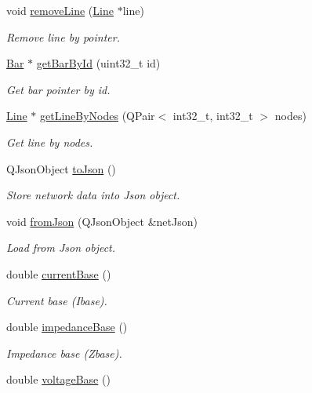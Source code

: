 \begin{DoxyCompactItemize}
void \hyperlink{group___models_ga4fd51288aa75614593977ce8aab9100f}{remove\+Line} (\hyperlink{class_line}{Line} $\ast$line)
\begin{DoxyCompactList}\small\item\em Remove line by pointer. \end{DoxyCompactList}\item 
\hyperlink{class_bar}{Bar} $\ast$ \hyperlink{group___models_ga04d524ce0fa0dd0d06deda92b1597af0}{get\+Bar\+By\+Id} (uint32\+\_\+t id)
\begin{DoxyCompactList}\small\item\em Get bar pointer by id. \end{DoxyCompactList}\item 
\hyperlink{class_line}{Line} $\ast$ \hyperlink{group___models_ga8f090b85a7779695cb9f05b6395b3044}{get\+Line\+By\+Nodes} (Q\+Pair$<$ int32\+\_\+t, int32\+\_\+t $>$ nodes)
\begin{DoxyCompactList}\small\item\em Get line by nodes. \end{DoxyCompactList}\item 
Q\+Json\+Object \hyperlink{group___models_ga1bb9773d3935eefef84136d388786494}{to\+Json} ()
\begin{DoxyCompactList}\small\item\em Store network data into Json object. \end{DoxyCompactList}\item 
void \hyperlink{group___models_ga2aef0f6c0d9569ec4d6b948d1ef0d5f1}{from\+Json} (Q\+Json\+Object \&net\+Json)
\begin{DoxyCompactList}\small\item\em Load from Json object. \end{DoxyCompactList}\item 
double \hyperlink{group___models_ga433bc5c32cf2ce5329bb40b21952d885}{current\+Base} ()
\begin{DoxyCompactList}\small\item\em Current base (Ibase). \end{DoxyCompactList}\item 
double \hyperlink{group___models_gae6794c93d37df113778c37c2c702f6d9}{impedance\+Base} ()
\begin{DoxyCompactList}\small\item\em Impedance base (Zbase). \end{DoxyCompactList}\item 
double \hyperlink{group___models_ga88cd2506aaf0b19513e41f00608093e0}{voltage\+Base} ()

\end{DoxyCompactItemize}
